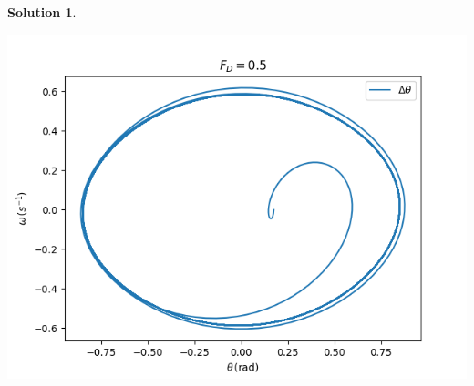 \documentclass[10pt]{article}
\theoremstyle{definition}
\newtheorem{soln}{Solution}
\begin{document}
\begin{soln}
\begin{enumerate}[label=(\alph*)]
\begin{center}
                        \includegraphics[scale=0.75]{Figure_7-2.png}
                  \end{center}
      \end{enumerate}
\end{soln}
\end{document}
